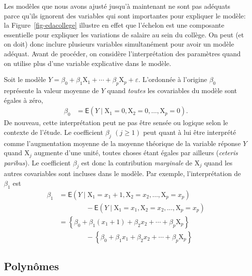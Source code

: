 \documentclass[
  11pt,
  letterpaper,
]{scrbook}
\theoremstyle{definition}
\theoremstyle{remark}
\begin{document}
Les modèles que nous avons ajusté jusqu'à maintenant ne sont pas
adéquats parce qu'ils ignorent des variables qui sont importantes pour
expliquer le modèle: la Figure~\ref{fig-edacollege} illustre en effet
que l'échelon est une composante essentielle pour expliquer les
variations de salaire au sein du collège. On peut (et on doit) donc
inclure plusieurs variables simultanément pour avoir un modèle adéquat.
Avant de procéder, on considère l'interprétation des paramètres quand on
utilise plus d'une variable explicative dans le modèle.

Soit le modèle
\(Y= \beta_0 + \beta_1 \mathrm{X}_1 + \cdots + \beta_p\mathrm{X}_p + \varepsilon\).
L'ordonnée à l'origine \(\beta_0\) représente la valeur moyenne de \(Y\)
quand \emph{toutes} les covariables du modèle sont égales à zéro,
\begin{align*}
\beta_0 &= \mathsf{E}(Y \mid \mathrm{X}_1=0,\mathrm{X}_2=0,\ldots,\mathrm{X}_p=0).
\end{align*} De nouveau, cette interprétation peut ne pas être sensée ou
logique selon le contexte de l'étude. Le coefficient \(\beta_j\)
\((j \geq 1)\) peut quant à lui être interprété comme l'augmentation
moyenne de la moyenne théorique de la variable réponse \(Y\) quand
\(\mathrm{X}_j\) augmente d'une unité, toutes choses étant égales par
ailleurs (\emph{ceteris paribus}). Le coefficient \(\beta_j\) est donc
la contribution \emph{marginale} de \(\mathrm{X}_j\) quand les autres
covariables sont incluses dans le modèle. Par exemple, l'interprétation
de \(\beta_1\) est \begin{align*}
\beta_1 &= \mathsf{E}(Y \mid \mathrm{X}_1=x_1+1,\mathrm{X}_2=x_2,\ldots,\mathrm{X}_p=x_p) \\
& \qquad \qquad - \mathsf{E}(Y \mid \mathrm{X}_1=x_1,\mathrm{X}_2=x_2,\ldots,\mathrm{X}_p=x_p) \\
&= \left\{\beta_0 + \beta_1 (x_1+1) + \beta_2 x_2 + \cdots +\beta_p \mathrm{X}_p \right\} \\
& \qquad \qquad -\left\{\beta_0 + \beta_1 x_1 + \beta_2 x_2 + \cdots +\beta_p \mathrm{X}_p \right\}
\end{align*}

\hypertarget{polynuxf4mes}{%
\subsection{Polynômes}\label{polynuxf4mes}}
\end{document}
